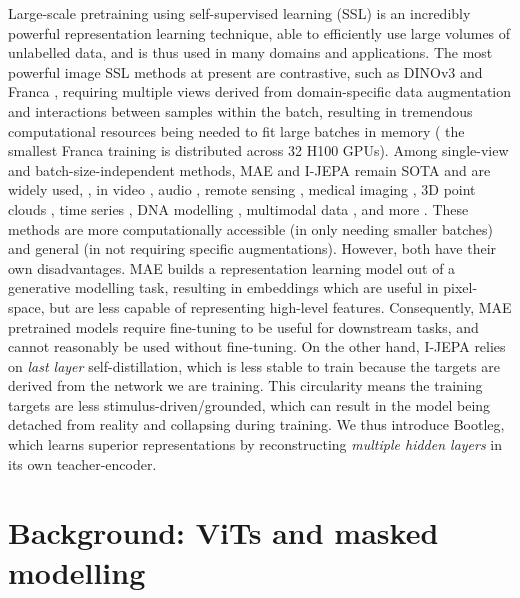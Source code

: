Large-scale pretraining using self-supervised learning (SSL) is an incredibly powerful representation learning technique, able to efficiently use large volumes of unlabelled data, and is thus used in many domains and applications.
The most powerful image SSL methods at present are contrastive, such as DINOv3 \citep{simeoni2025dinov3} and Franca \citep{venkataramanan2025franca}, requiring multiple views derived from domain-specific data augmentation and interactions between samples within the batch, resulting in tremendous computational resources being needed to fit large batches in memory (\eg{} the smallest Franca training is distributed across 32 H100 GPUs).
Among single-view and batch-size-independent methods, MAE \citep{he2022masked} and I-JEPA \citep{assran2023ijepa} remain SOTA and are widely used, \eg{}, in video \citep{wang2023videomaev2, bardes2024vjepa, assran2025vjepa2}, audio \citep{huang2022audiomae, fei2024ajepa, tuncay2025audiojepa, yuksel2025wavjepa}, remote sensing \citep{cong2022satmae, fuller2022satvit}, medical imaging \citep{zhou2023self, xiao2023delving}, 3D point clouds \citep{zhang2022point, chen2023pimae}, time series \citep{nie2023a, li2023ti}, DNA modelling \citep{safari2025enhancingdnafoundationmodels}, multimodal data \citep{bachmann2022multimae, chen2025vljepa, lei2025m3jepa}, and more \citep{dong2024brainjepa, Riou2024_StemJEPA, thimonier2025tjepa, hachana2025using}.
These methods are more computationally accessible (in only needing smaller batches) and general (in not requiring specific augmentations).
However, both have their own disadvantages.
MAE builds a representation learning model out of a generative modelling task, resulting in embeddings which are useful in pixel-space, but are less capable of representing high-level features.
Consequently, MAE pretrained models require fine-tuning to be useful for downstream tasks, and cannot reasonably be used without fine-tuning.
On the other hand, I-JEPA relies on \emph{last layer} self-distillation, which is less stable to train because the targets are derived from the network we are training.
This circularity means the training targets are less stimulus-driven/grounded, which can result in the model being detached from reality and collapsing during training.
We thus introduce Bootleg, which learns superior representations by reconstructing \emph{multiple hidden layers} in its own teacher-encoder.


\section{Background: ViTs and masked modelling}

